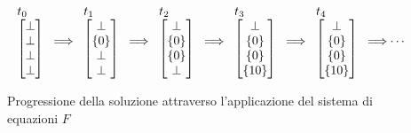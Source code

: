 \begin{example}
\begin{figure}[H]
    \centering
\[
\arraycolsep=1.1pt
\begin{array}{ccccccccccc}
    \begin{tabular}{l}
    $
    t_0
    $ \\
    $
    \begin{bmatrix}
       \perp \\
       \perp \\
       \perp \\
       \perp
    \end{bmatrix}
    $
    \end{tabular}
    &
    \Longrightarrow
    &
    \begin{tabular}{l}
    $t_1$ \\
    $
    \begin{bmatrix}
       \perp \\
       \{0\} \\
       \perp \\
       \perp
    \end{bmatrix}
    $
    \end{tabular}
    &
    \Longrightarrow
    &
    \begin{tabular}{l}
    $t_2$ \\
    $
    \begin{bmatrix}
       \perp \\
       \{0\} \\
       \{0\} \\
       \perp
    \end{bmatrix}
    $
    \end{tabular}
    &
    \Longrightarrow
    &
    \begin{tabular}{l}
    $t_3$ \\
    $
    \begin{bmatrix}
       \perp \\
       \{0\} \\
       \{0\} \\
       \{10\}
    \end{bmatrix}
    $
    \end{tabular}
    &
    \Longrightarrow
    &
    \begin{tabular}{l}
    $t_4$ \\
    $
    \begin{bmatrix}
       \perp \\
       \{0\} \\
       \{0\} \\
       \{10\}
    \end{bmatrix}
    $
    \end{tabular}
    &
    \Longrightarrow
    &
    \cdots
\end{array}
\]
    \caption{Progressione della soluzione attraverso l'applicazione del sistema di equazioni \(F\)}
    \label{fig:progression}
\end{figure}


\end{example}
